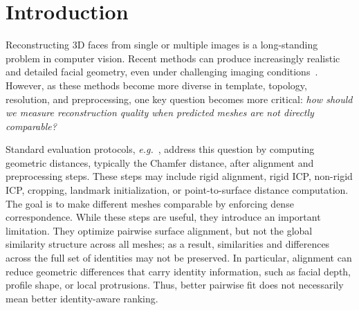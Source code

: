 \documentclass{article}
\begin{document}
\section{Introduction}
Reconstructing 3D faces from single or multiple images is a long-standing problem in computer vision. Recent methods can produce increasingly realistic and detailed facial geometry, even under challenging imaging conditions~\cite{3ddfav2, 3di, deca, deep3d, mica, synergynet, emoca, inorig}. However, as these methods become more diverse in template, topology, resolution, and preprocessing, one key question becomes more critical: \emph{how should we measure reconstruction quality when predicted meshes are not directly comparable?}

Standard evaluation protocols, \textit{e.g.}~\cite{now,REALY}, address this question by computing geometric distances, typically the Chamfer distance, after alignment and preprocessing steps. These steps may include rigid alignment, rigid ICP, non-rigid ICP, cropping, landmark initialization, or point-to-surface distance computation. The goal is to make different meshes comparable by enforcing dense correspondence. While these steps are useful, they introduce an important limitation. They optimize pairwise surface alignment, but not the global similarity structure across all meshes; as a result, similarities and differences across the full set of identities may not be preserved. In particular, alignment can reduce geometric differences that carry identity information, such as facial depth, profile shape, or local protrusions. Thus, better pairwise fit does not necessarily mean better identity-aware ranking.
\end{document}
